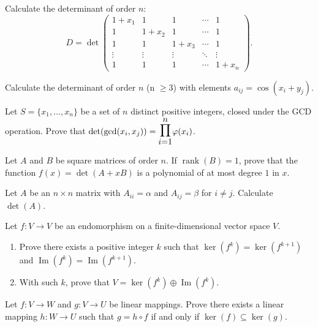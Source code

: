 \documentclass[12pt]{article}
\let\oldprod\prod
\renewcommand{\prod}{\mathlarger{\mathlarger{\oldprod}}}
\begin{document}
\begin{problem}
Calculate the determinant of order $n$:
\[
D = \det\begin{pmatrix}
1+x_1 & 1 & 1 & \cdots & 1\\
1 & 1+x_2 & 1 & \cdots & 1\\
1 & 1 & 1+x_3 & \cdots & 1\\
\vdots & \vdots & \vdots & \ddots & \vdots\\
1 & 1 & 1 & \cdots & 1+x_n
\end{pmatrix}.
\]
\end{problem}

\begin{problem}
Calculate the determinant of order $n$ (n $\ge 3$) with elements $a_{ij}=\cos(x_i+y_j)$.
\end{problem}

\begin{problem}
Let $S=\{x_1,\dots,x_n\}$ be a set of $n$ distinct positive integers, closed under the GCD operation. Prove that $\det(\gcd(x_i,x_j)) = \prod_{i=1}^n \varphi(x_i)$.
\end{problem}

\begin{problem}
Let $A$ and $B$ be square matrices of order $n$. If $\operatorname{rank}(B)=1$, prove that the function $f(x)=\det(A+xB)$ is a polynomial of at most degree $1$ in $x$.
\end{problem}

\begin{problem}
Let $A$ be an $n\times n$ matrix with $A_{ii}=\alpha$ and $A_{ij}=\beta$ for $i\ne j$. Calculate $\det(A)$.
\end{problem}

\begin{problem}
Let $f:V\to V$ be an endomorphism on a finite-dimensional vector space $V$.
\begin{enumerate}[label=(\alph*)]
\item Prove there exists a positive integer $k$ such that $\ker(f^k)=\ker(f^{k+1})$ and $\operatorname{Im}(f^k)=\operatorname{Im}(f^{k+1})$.
\item With such $k$, prove that $V=\ker(f^k)\oplus \operatorname{Im}(f^k)$.
\end{enumerate}
\end{problem}

\begin{problem}
Let $f:V\to W$ and $g:V\to U$ be linear mappings. Prove there exists a linear mapping $h:W\to U$ such that $g=h\circ f$ if and only if $\ker(f)\subseteq \ker(g)$.
\end{problem}
\end{document}
